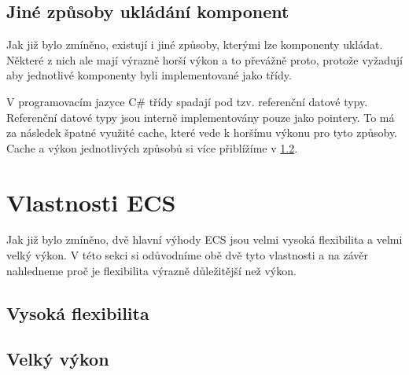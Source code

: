 


\subsection{Jiné způsoby ukládání komponent}
Jak již bylo zmíněno, existují i jiné způsoby, kterými lze komponenty ukládat. Některé z nich ale mají výrazně horší výkon a to převážně proto, protože vyžadují aby jednotlivé komponenty byli implementované jako třídy.

V programovacím jazyce C\# třídy spadají pod tzv. referenční datové typy. Referenční datové typy jsou interně implementovány pouze jako pointery. To má za následek špatné využité cache, které vede k horšímu výkonu pro tyto způsoby. Cache a výkon jednotlivých způsobů si více přiblížíme v \ref{sec:ecs_props}.


\section{Vlastnosti ECS}
Jak již bylo zmíněno, dvě hlavní výhody ECS jsou velmi vysoká flexibilita a velmi velký výkon. V této sekci si odůvodníme obě dvě tyto vlastnosti a na závěr nahledneme proč je flexibilita výrazně důležitější než výkon.

\subsection{Vysoká flexibilita}


\subsection{Velký výkon}
\label{sec:ecs_props}


